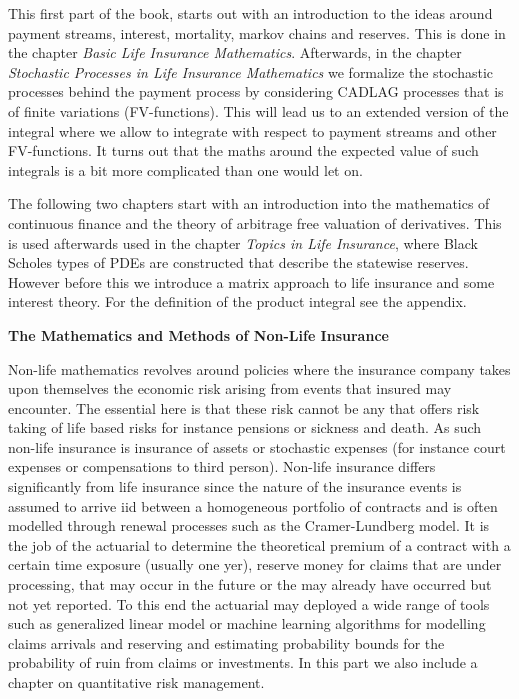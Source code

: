 \documentclass[a4paper,12pt,openany]{book}
\begin{document}
This first part of the book, starts out with an introduction to the ideas around payment streams, interest, mortality, markov chains and reserves. This is done in the chapter \emph{Basic Life Insurance Mathematics}. Afterwards, in the chapter \emph{Stochastic Processes in Life Insurance Mathematics} we formalize the stochastic processes behind the payment process by considering CADLAG processes that is of finite variations (FV-functions). This will lead us to an extended version of the integral where we allow to integrate with respect to payment streams and other FV-functions. It turns out that the maths around the expected value of such integrals is a bit more complicated than one would let on.

The following two chapters start with an introduction into the mathematics of continuous finance and the theory of arbitrage free valuation of derivatives. This is used afterwards used in the chapter \emph{Topics in Life Insurance}, where Black Scholes types of PDEs are constructed that describe the statewise reserves. However before this we introduce a matrix approach to life insurance and some interest theory. For the definition of the product integral see the appendix.

\textbf{The Mathematics and Methods of Non-Life Insurance}

Non-life mathematics revolves around policies where the insurance company takes upon themselves the economic risk arising from events that insured may encounter. The essential here is that these risk cannot be any that offers risk taking of life based risks for instance pensions or sickness and death. As such non-life insurance is insurance of assets or stochastic expenses (for instance court expenses or compensations to third person). Non-life insurance differs significantly from life insurance since the nature of the insurance events is assumed to arrive iid between a homogeneous portfolio of contracts and is often modelled through renewal processes such as the Cramer-Lundberg model. It is the job of the actuarial to determine the theoretical premium of a contract with a certain time exposure (usually one yer), reserve money for claims that are under processing, that may occur in the future or the may already have occurred but not yet reported. To this end the actuarial may deployed a wide range of tools such as generalized linear model or machine learning algorithms for modelling claims arrivals and reserving and estimating probability bounds for the probability of ruin from claims or investments. In this part we also include a chapter on quantitative risk management.
\end{document}
